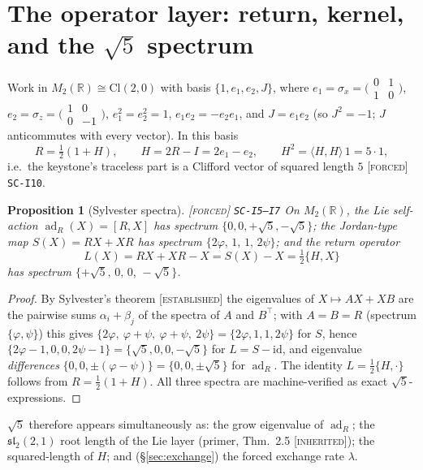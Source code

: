 \documentclass[11pt]{article}
\newcommand{\tagF}{\textcolor{cF}{\textsc{[forced]}}}
\newcommand{\tagI}{\textcolor{cI}{\textsc{[inherited]}}}
\newcommand{\tagE}{\textcolor{cE}{\textsc{[established]}}}
\newcommand{\hx}[1]{\textcolor{cC}{\footnotesize\texttt{#1}}}
\newcommand{\R}{\mathbb{R}}
\newcommand{\gp}{\varphi}
\newcommand{\gq}{\psi}
\newcommand{\adR}{\operatorname{ad}_R}
\theoremstyle{plain}
\newtheorem{proposition}[theorem]{Proposition}
\theoremstyle{definition}
\theoremstyle{remark}
\begin{document}
\section{The operator layer: return, kernel, and the $\sqrt5$ spectrum}\label{sec:operators}

Work in $M_2(\R)\cong\mathrm{Cl}(2,0)$ with basis $\{1,e_1,e_2,J\}$, where
$e_1=\sigma_x=\bigl(\begin{smallmatrix}0&1\\1&0\end{smallmatrix}\bigr)$,
$e_2=\sigma_z=\bigl(\begin{smallmatrix}1&0\\0&-1\end{smallmatrix}\bigr)$,
$e_1^2=e_2^2=1$, $e_1e_2=-e_2e_1$, and $J=e_1e_2$ (so $J^2=-1$; $J$ anticommutes with
every vector). In this basis
\begin{equation}\label{eq:HinClifford}
R=\tfrac12(1+H),\qquad H=2R-I=2e_1-e_2,\qquad H^2=\langle H,H\rangle\,1=5\cdot 1,
\end{equation}
i.e.\ the keystone's traceless part is a Clifford vector of squared length $5$
\tagF{} \hx{SC-I10}.

\begin{proposition}[Sylvester spectra]\label{prop:sylvester}\tagF{} \hx{SC-I5--I7}
On $M_2(\R)$, the Lie self-action $\adR(X)=[R,X]$ has spectrum $\{0,0,+\sqrt5,-\sqrt5\}$;
the Jordan-type map $S(X)=RX+XR$ has spectrum $\{2\gp,\,1,\,1,\,2\gq\}$; and the
\emph{return operator}
\[
L(X)=RX+XR-X=S(X)-X=\tfrac12\{H,X\}
\]
has spectrum $\{+\sqrt5,\,0,\,0,\,-\sqrt5\}$.
\end{proposition}

\begin{proof}
By Sylvester's theorem \tagE{} \cite{HornJohnson1991} the eigenvalues of
$X\mapsto AX+XB$ are the pairwise sums $\alpha_i+\beta_j$ of the spectra of $A$ and
$B^{\!\top}$; with $A=B=R$ (spectrum $\{\gp,\gq\}$) this gives
$\{2\gp,\ \gp+\gq,\ \gp+\gq,\ 2\gq\}=\{2\gp,1,1,2\gq\}$ for $S$, hence
$\{2\gp-1,0,0,2\gq-1\}=\{\sqrt5,0,0,-\sqrt5\}$ for $L=S-\mathrm{id}$, and eigenvalue
\emph{differences} $\{0,0,\pm(\gp-\gq)\}=\{0,0,\pm\sqrt5\}$ for $\adR$. The identity
$L=\tfrac12\{H,\cdot\}$ follows from $R=\tfrac12(1+H)$. All three spectra are
machine-verified as exact $\sqrt5$-expressions.
\end{proof}

$\sqrt5$ therefore appears simultaneously as: the grow eigenvalue of $\adR$; the
$\mathfrak{sl}_2(2,1)$ root length of the Lie layer (primer, Thm.\ 2.5 \tagI{}); the
squared-length of $H$; and (\S\ref{sec:exchange}) the forced exchange rate $\lambda$.
\end{document}

